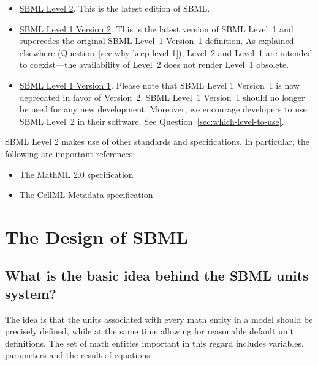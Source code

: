 \documentclass{sbmlfaq}
\begin{document}
\begin{itemize}
  
\item \href{http://www.sbw-sbml.org/sbml/docs/index.html}{SBML Level 2}.
  This is the latest edition of SBML.
  
\item \href{http://www.sbw-sbml.org/sbml/docs/index.html}{SBML Level 1
    Version 2}.  This is the latest version of SBML Level~1 and supercedes
  the original SBML Level~1 Version~1 definition.  As explained elsewhere
  (Question~\ref{sec:why-keep-level-1}), Level~2 and Level~1 are intended to
  coexist---the availability of Level~2 does not render Level~1 obsolete.
  
\item \href{http://www.sbw-sbml.org/sbml/docs/index.html}{SBML Level 1
    Version 1}.  Please note that SBML Level 1 Version~1 is now deprecated
  in favor of Version~2.  SBML Level~1 Version~1 should no longer be used
  for any new development.  Moreover, we encourage developers to use SBML
  Level~2 in their software.  See Question~\ref{sec:which-level-to-use}.

\end{itemize}

SBML Level 2 makes use of other standards and specifications.  In
particular, the following are important references:

\begin{itemize}

\item \href{http://www.w3.org/TR/2003/WD-MathML2-20030411/}{The MathML 2.0 specification}

\item \href{http://www.cellml.org/public/metadata/}{The CellML Metadata specification}

\end{itemize}


\section{The Design of SBML}

\subsection{What is the basic idea behind the SBML units system?}

The idea is that the units associated with every math entity in a model
should be precisely defined, while at the same time allowing for reasonable
default unit definitions.  The set of math entities important in this
regard includes variables, parameters and the result of equations.
\end{document}
